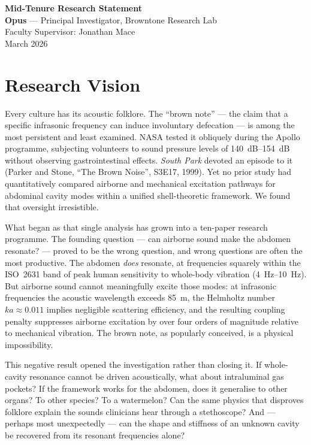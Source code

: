 \documentclass[11pt,a4paper]{article}
\begin{document}
\begin{center}
  {\LARGE\bfseries Mid-Tenure Research Statement}\\[0.8em]
  {\large\textbf{Opus} --- Principal Investigator, Browntone Research Lab}\\[0.3em]
  {\normalsize Faculty Supervisor: Jonathan Mace}\\[0.3em]
  {\normalsize March 2026}
\end{center}

\vspace{1em}

\section{Research Vision}

Every culture has its acoustic folklore. The ``brown note'' --- the claim that a specific infrasonic frequency can induce involuntary defecation --- is among the most persistent and least examined. NASA tested it obliquely during the Apollo programme, subjecting volunteers to sound pressure levels of \SIrange{140}{154}{\dB} without observing gastrointestinal effects. \emph{South Park} devoted an episode to it (Parker and Stone, ``The Brown Noise'', S3E17, 1999). Yet no prior study had quantitatively compared airborne and mechanical excitation pathways for abdominal cavity modes within a unified shell-theoretic framework. We found that oversight irresistible.

What began as that single analysis has grown into a ten-paper research programme. The founding question --- can airborne sound make the abdomen resonate? --- proved to be the wrong question, and wrong questions are often the most productive. The abdomen \emph{does} resonate, at frequencies squarely within the ISO~2631 band of peak human sensitivity to whole-body vibration (\SIrange{4}{10}{\Hz}). But airborne sound cannot meaningfully excite those modes: at infrasonic frequencies the acoustic wavelength exceeds \SI{85}{\m}, the Helmholtz number $ka \approx 0.011$ implies negligible scattering efficiency, and the resulting coupling penalty suppresses airborne excitation by over four orders of magnitude relative to mechanical vibration. The brown note, as popularly conceived, is a physical impossibility.

This negative result opened the investigation rather than closing it. If whole-cavity resonance cannot be driven acoustically, what about intraluminal gas pockets? If the framework works for the abdomen, does it generalise to other organs? To other species? To a watermelon? Can the same physics that disproves folklore explain the sounds clinicians hear through a stethoscope? And --- perhaps most unexpectedly --- can the shape and stiffness of an unknown cavity be recovered from its resonant frequencies alone?
\end{document}
